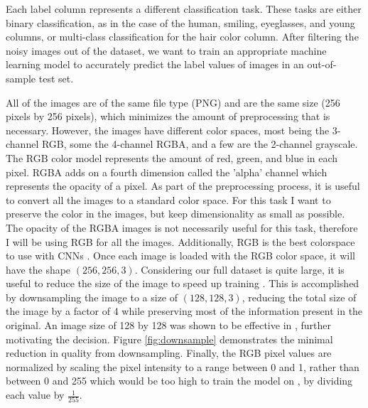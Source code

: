 \documentclass[10pt,twocolumn,letterpaper]{article}
\begin{document}
Each label column represents a different classification task. These tasks are either binary classification, as in the case of the human, smiling, eyeglasses, and young columns, or multi-class classification for the hair color column. After filtering the noisy images out of the dataset, we want to train an appropriate machine learning model to accurately predict the label values of images in an out-of-sample test set.

All of the images are of the same file type (PNG) and are the same size (256 pixels by 256 pixels), which minimizes the amount of preprocessing that is necessary. However, the images have different color spaces, most being the 3-channel RGB, some the 4-channel RGBA, and a few are the 2-channel grayscale. The RGB color model represents the amount of red, green, and blue in each pixel. RGBA adds on a fourth dimension called the 'alpha' channel which represents the opacity of a pixel. As part of the preprocessing process, it is useful to convert all the images to a standard color space. For this task I want to preserve the color in the images, but keep dimensionality as small as possible. The opacity of the RGBA images is not necessarily useful for this task, therefore I will be using RGB for all the images. Additionally, RGB is the best colorspace to use with CNNs \cite{DBLP:journals/corr/MishkinSM16}. Once each image is loaded with the RGB color space, it will have the shape $(256, 256, 3)$. Considering our full dataset is quite large, it is useful to reduce the size of the image to speed up training \cite[p.34]{nixon2012feature}. This is accomplished by downsampling the image to a size of $(128, 128, 3)$, reducing the total size of the image by a factor of 4 while preserving most of the information present in the original. An image size of 128 by 128 was shown to be effective in \cite{DBLP:journals/corr/MishkinSM16}, further motivating the decision. Figure \ref{fig:downsample} demonstrates the minimal reduction in quality from downsampling. Finally, the RGB pixel values are normalized by scaling the pixel intensity to a range between 0 and 1, rather than between 0 and 255 which would be too high to train the model on \cite{cholletbuildingpowerful}, by dividing each value by $\frac{1}{255}$.
\end{document}
